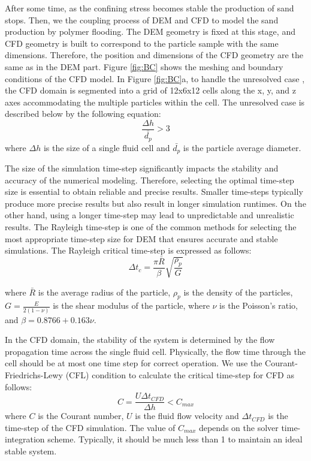 \documentclass{article}
\begin{document}
After some time, as the confining stress becomes stable the production of sand stops. Then, we the coupling process of DEM and CFD to model the sand production by polymer flooding. The DEM geometry is fixed at this stage, and CFD geometry is built to correspond to the particle sample with the same dimensions. Therefore, the position and dimensions of the CFD geometry are the same as in the DEM part. Figure \ref{fig:BC} shows the meshing and boundary conditions of the CFD model. In Figure \ref{fig:BC}a, to handle the unresolved case \citep{clarke2018investigation}, the CFD domain is segmented into a grid of 12x6x12 cells along the x, y, and z axes accommodating the multiple particles within the cell. The unresolved case is described below by the following equation:
  \begin{equation}
 \frac{\Delta h}{\bar{d_p}} > 3 \label{eq:13}
 \end{equation}
 where $\Delta h$ is the size of a single fluid cell and  $\bar{d_p}$ is the particle average diameter. 

The size of the simulation time-step significantly impacts the stability and accuracy of the numerical modeling. Therefore, selecting the optimal time-step size is essential to obtain reliable and precise results. Smaller time-steps typically produce more precise results but also result in longer simulation runtimes. On the other hand, using a longer time-step may lead to unpredictable and unrealistic results. The Rayleigh time-step \cite{li2005comparison} is one of the common methods for selecting the most appropriate time-step size for DEM that ensures accurate and stable simulations. The Rayleigh critical time-step is expressed as follows:
  \begin{equation}
\Delta t_{c} = \frac{\pi \bar{R}}{\beta} \sqrt{\frac{\rho_p}{G}} \label{eq:Rayleigh}
\end{equation}

where $\bar{R}$ is the average radius of the particle, $\rho_p$ is the density of the particles, $G = \frac{E}{2(1-\nu)}$ is the shear modulus of the particle, where $\nu$ is the Poisson's ratio, and $\beta = 0.8766 + 0.163 \nu$.

In the CFD domain, the stability of the system is determined by the flow propagation time across the single fluid cell. Physically, the flow time through the cell should be at most one time step for correct operation. We use the Courant-Friedrichs-Lewy (CFL) condition \citep{courant1928partiellen} to calculate the critical time-step for CFD as follows:
\begin{equation}
C=\frac{U \Delta t_{CFD}}{\Delta h}<C_{max} \label{eq:CFL}
\end{equation}
where $C$ is the Courant number, $U$ is the fluid flow velocity and $\Delta t_{CFD}$ is the time-step of the CFD simulation. The value  of $C_{max}$ depends on the solver time-integration scheme. Typically, it should be much less than 1 to maintain an ideal stable system.
\end{document}
